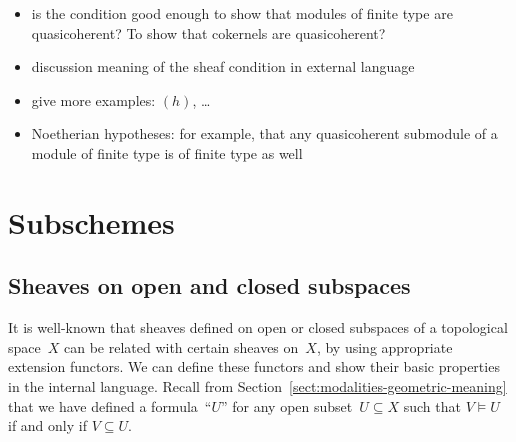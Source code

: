 \documentclass[10pt]{amsart}
\theoremstyle{definition}
\theoremstyle{plain}
\theoremstyle{remark}
\newcommand{\?}{\,{:}\,}
\renewcommand{\_}{\mathpunct{.}\,}
\begin{document}
\begin{itemize}
\item is the condition good enough to show that modules of finite type are
quasicoherent? To show that cokernels are quasicoherent?
\item discussion meaning of the sheaf condition in external language
\item give more examples: $(h)$, \ldots
\item Noetherian hypotheses: for example, that any quasicoherent submodule of a
module of finite type is of finite type as well
\end{itemize}


\section{Subschemes}

\subsection{Sheaves on open and closed subspaces} It is well-known that sheaves
defined on open or closed subspaces of a topological space~$X$ can be related
with certain sheaves on~$X$, by using appropriate extension functors. We can
define these functors and show their basic properties in the internal
language. Recall from Section~\ref{sect:modalities-geometric-meaning} that we
have defined a formula~``$U$'' for any open subset~$U \subseteq X$ such that
$V \models U$ if and only if $V \subseteq U$.
\end{document}
